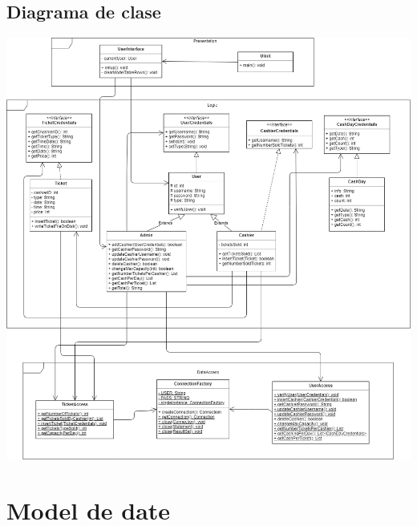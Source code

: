 \documentclass[11pt,a4paper,twoside,notitlepage]{article}
\begin{document}
\subsection{Diagrama de clase}
\includegraphics[height=.75\textheight]{ClassDiagram}

\section{Model de date}
\end{document}
